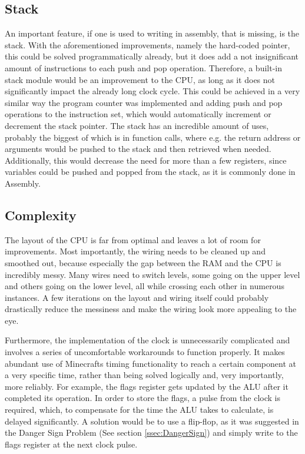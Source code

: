 \subsection{Stack}
An important feature, if one is used to writing in assembly, that is missing, is the stack. With the aforementioned improvements, namely the hard-coded pointer, this could be solved programmatically already, but it does add a not insignificant amount of instructions to each push and pop operation. Therefore, a built-in stack module would be an improvement to the CPU, as long as it does not significantly impact the already long clock cycle. This could be achieved in a very similar way the program counter was implemented and adding push and pop operations to the instruction set, which would automatically increment or decrement the stack pointer. The stack has an incredible amount of uses, probably the biggest of which is in function calls, where e.g. the return address or arguments would be pushed to the stack and then retrieved when needed. Additionally, this would decrease the need for more than a few registers, since variables could be pushed and popped from the stack, as it is commonly done in Assembly.

\subsection{Complexity}
The layout of the CPU is far from optimal and leaves a lot of room for improvements. Most importantly, the wiring needs to be cleaned up and smoothed out, because especially the gap between the RAM and the CPU is incredibly messy. Many wires need to switch levels, some going on the upper level and others going on the lower level, all while crossing each other in numerous instances. A few iterations on the layout and wiring itself could probably drastically reduce the messiness and make the wiring look more appealing to the eye.

Furthermore, the implementation of the clock is unnecessarily complicated and involves a series of uncomfortable workarounds to function properly. It makes abundant use of Minecrafts timing functionality to reach a certain component at a very specific time, rather than being solved logically and, very importantly, more reliably. For example, the flags register gets updated by the ALU after it completed its operation. In order to store the flags, a pulse from the clock is required, which, to compensate for the time the ALU takes to calculate, is delayed significantly. A solution would be to use a flip-flop, as it was suggested in the Danger Sign Problem (See section \ref{ssec:DangerSign}) and simply write to the flags register at the next clock pulse.
